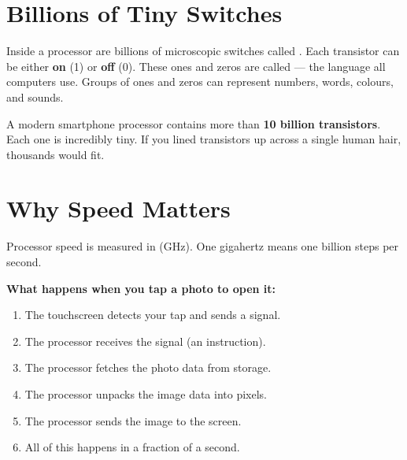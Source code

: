 \sectionrule

\section*{Billions of Tiny Switches}

Inside a processor are billions of microscopic switches called .
Each transistor can be either \textbf{on} (1) or \textbf{off} (0).
These ones and zeros are called  — the language all computers use.
Groups of ones and zeros can represent numbers, words, colours, and sounds.

\begin{funfact}
  A modern smartphone processor contains more than \textbf{10 billion transistors}.
  Each one is incredibly tiny. If you lined transistors up across a single
  human hair, thousands would fit.
\end{funfact}

\sectionrule

\section*{Why Speed Matters}

Processor speed is measured in  (GHz).
One gigahertz means one billion steps per second.

\begin{quickmap}
  \textbf{What happens when you tap a photo to open it:}
  \begin{enumerate}[label=\textbf{\arabic*.}]
    \item The touchscreen detects your tap and sends a signal.
    \item The processor receives the signal (an instruction).
    \item The processor fetches the photo data from storage.
    \item The processor unpacks the image data into pixels.
    \item The processor sends the image to the screen.
    \item All of this happens in a fraction of a second.
  \end{enumerate}
\end{quickmap}

